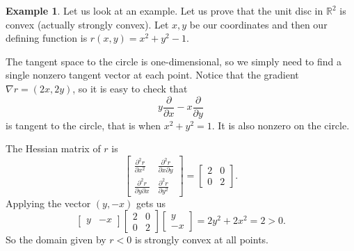 \documentclass[12pt,openany]{book}
\newcommand{\R}{{\mathbb{R}}}
\theoremstyle{plain}
\theoremstyle{remark}
\theoremstyle{definition}
\theoremstyle{exercise}
\theoremstyle{example}
\newtheorem{example}[thm]{Example}
\begin{document}
\begin{example}
Let us look at an example.  Let us prove that the unit disc in $\R^2$ is
convex (actually strongly convex).  Let $x,y$ be our coordinates and then
our defining function is $r(x,y) = x^2+y^2-1$.

The tangent space to the circle is one-dimensional, so we simply need to
find a single nonzero tangent vector at each point.
Notice that the gradient
%
$\nabla r = (2x,2y)$, so it is easy to check that
\begin{equation*}
y \frac{\partial}{\partial x} - x \frac{\partial}{\partial y}
\end{equation*}
is tangent to the circle, that is when $x^2+y^2=1$.  It is also nonzero on the circle.

The Hessian matrix of $r$ is
\begin{equation*}
\begin{bmatrix}
\frac{\partial^2 r}{\partial x^2} &
\frac{\partial^2 r}{\partial x \partial y} \\
\frac{\partial^2 r}{\partial y \partial x} &
\frac{\partial^2 r}{\partial y^2}
\end{bmatrix}
=
\begin{bmatrix}
2 & 0 \\
0 & 2
\end{bmatrix} .
\end{equation*}
Applying the vector $(y,-x)$ gets us
\begin{equation*}
\begin{bmatrix}
y & -x
\end{bmatrix}
\begin{bmatrix}
2 & 0 \\
0 & 2
\end{bmatrix}
\begin{bmatrix}
y \\ -x
\end{bmatrix}
=
2y^2+2x^2 = 2 > 0 .
\end{equation*}
So the domain given by $r < 0$ is strongly convex at all points.
\end{example}
\end{document}
